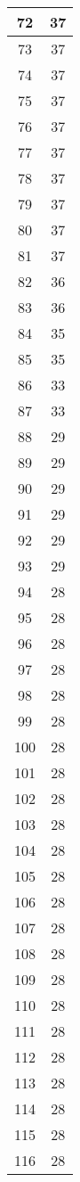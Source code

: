 \documentclass[letterpaper, 12pt]{article}
\begin{document}
\begin{longtable}{|c|c|}
\hline
72 & 37 \\
\hline
73 & 37 \\
\hline
74 & 37 \\
\hline
75 & 37 \\
\hline
76 & 37 \\
\hline
77 & 37 \\
\hline
78 & 37 \\
\hline
79 & 37 \\
\hline
80 & 37 \\
\hline
81 & 37 \\
\hline
82 & 36 \\
\hline
83 & 36 \\
\hline
84 & 35 \\
\hline
85 & 35 \\
\hline
86 & 33 \\
\hline
87 & 33 \\
\hline
88 & 29 \\
\hline
89 & 29 \\
\hline
90 & 29 \\
\hline
91 & 29 \\
\hline
92 & 29 \\
\hline
93 & 29 \\
\hline
94 & 28 \\
\hline
95 & 28 \\
\hline
96 & 28 \\
\hline
97 & 28 \\
\hline
98 & 28 \\
\hline
99 & 28 \\
\hline
100 & 28 \\
\hline
101 & 28 \\
\hline
102 & 28 \\
\hline
103 & 28 \\
\hline
104 & 28 \\
\hline
105 & 28 \\
\hline
106 & 28 \\
\hline
107 & 28 \\
\hline
108 & 28 \\
\hline
109 & 28 \\
\hline
110 & 28 \\
\hline
111 & 28 \\
\hline
112 & 28 \\
\hline
113 & 28 \\
\hline
114 & 28 \\
\hline
115 & 28 \\
\hline
116 & 28 \\

\end{longtable}
\end{document}
